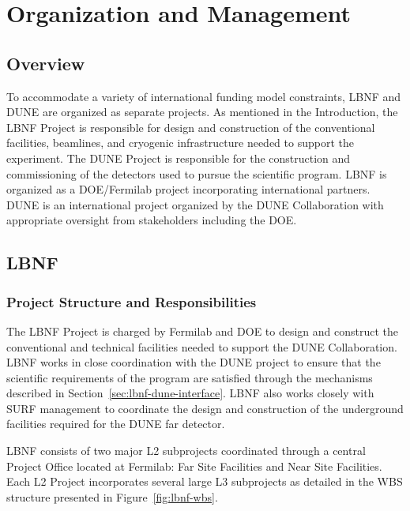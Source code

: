 \chapter{Organization and Management}
\label{v1ch:org-mgmt}

\section{Overview}

To accommodate a variety of international funding model constraints, LBNF and DUNE are organized as separate projects. As mentioned in the Introduction, the LBNF Project is responsible for design and construction of the conventional facilities, beamlines, and cryogenic infrastructure needed to support the experiment.  The DUNE Project is responsible for the construction and commissioning of the detectors used to pursue the scientific program.  LBNF is organized as a DOE/Fermilab project incorporating international partners.   DUNE is an international project organized by the DUNE Collaboration with appropriate oversight from stakeholders including the DOE.

\section{LBNF}

\subsection{Project Structure and Responsibilities}

The LBNF Project is charged by Fermilab and DOE to design and construct the conventional and technical facilities needed to support the DUNE Collaboration.  LBNF works in close coordination with the DUNE project to ensure that the scientific requirements of the program are satisfied through the mechanisms described in Section~\ref{sec:lbnf-dune-interface}. LBNF also works closely with SURF management to coordinate the design and construction of the underground facilities required for the DUNE far detector. 

LBNF consists of two major L2 subprojects coordinated through a central Project Office located at Fermilab: Far Site Facilities and Near Site Facilities. Each L2 Project incorporates several large L3 subprojects as detailed in the WBS structure presented in Figure~\ref{fig:lbnf-wbs}.

